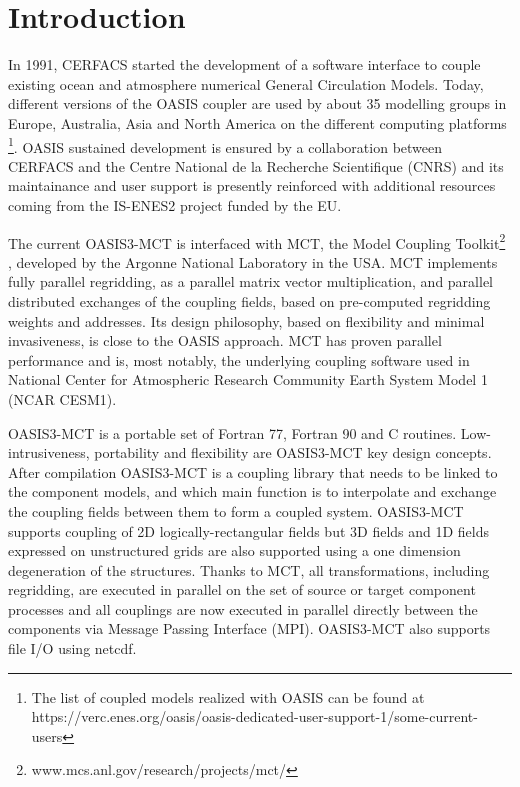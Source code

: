 \newpage
\chapter{Introduction}
\label{sec_step}

In 1991, CERFACS started the development of
a software interface to couple existing ocean and atmosphere numerical General
Circulation Models. Today, different versions of the 
OASIS coupler are used by about 35 modelling groups in Europe, Australia, Asia and
North America on the different computing platforms \citep{valcke8}\footnote{The list of
coupled models realized with OASIS can be found at https://verc.enes.org/oasis/oasis-dedicated-user-support-1/some-current-users}.
OASIS sustained development is ensured by a collaboration
between CERFACS and the Centre National de la Recherche Scientifique
(CNRS) and its maintainance and user support is presently reinforced
with additional resources coming from the IS-ENES2 project funded by the EU.

The current OASIS3-MCT is interfaced with MCT, the Model
Coupling Toolkit\footnote{www.mcs.anl.gov/research/projects/mct/} \citep{mct_larson} \newline \citep{mct_jacob}, developed by the Argonne National Laboratory in the USA. MCT implements fully parallel regridding, as a parallel matrix vector 
multiplication, and parallel distributed exchanges of the coupling
fields, based on pre-computed regridding weights and addresses. 
Its design philosophy, based on flexibility and minimal invasiveness,
is close to the OASIS approach. 
MCT has proven parallel performance and is, most notably, the
underlying coupling software used in National Center for Atmospheric
Research Community Earth System Model 1 (NCAR CESM1).

OASIS3-MCT is a portable set of Fortran 77, Fortran 90 and C routines. Low-intrusiveness, portability and flexibility are OASIS3-MCT key design concepts. After compilation OASIS3-MCT is a coupling library that needs to be linked to the component models, and which main function is to interpolate and exchange the coupling fields between them to form a coupled system.  OASIS3-MCT supports  coupling of 2D logically-rectangular fields but 3D fields and 1D fields expressed on unstructured grids are also supported using a one dimension degeneration of the structures. Thanks to MCT, all transformations, including regridding, are executed in parallel on the set of source or target component processes and all couplings are now executed in parallel directly between the components via Message Passing Interface
(MPI). OASIS3-MCT also supports file I/O using netcdf.  

